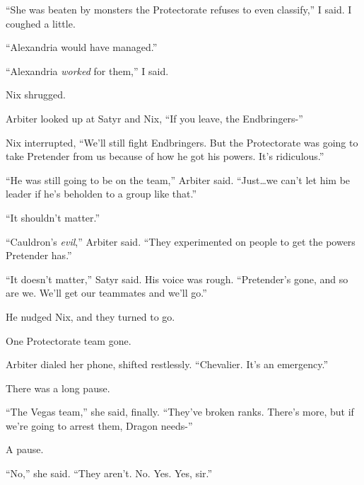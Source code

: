 ``She was beaten by monsters the Protectorate refuses to even classify,'' I said.  I coughed a little.



``Alexandria would have managed.''



``Alexandria \emph{worked} for them,'' I said.



Nix shrugged.



Arbiter looked up at Satyr and Nix, ``If you leave, the Endbringers-''



Nix interrupted, ``We'll still fight Endbringers.  But the Protectorate was going to take Pretender from us because of how he got his powers.  It's ridiculous.''



``He was still going to be on the team,'' Arbiter said.  ``Just\ldots we can't let him be leader if he's beholden to a group like that.''



``It shouldn't matter.''



``Cauldron's \emph{evil},'' Arbiter said.  ``They experimented on people to get the powers Pretender has.''



``It doesn't matter,'' Satyr said.  His voice was rough.  ``Pretender's gone, and so are we.  We'll get our teammates and we'll go.''



He nudged Nix, and they turned to go.



One Protectorate team gone.



Arbiter dialed her phone, shifted restlessly.  ``Chevalier.  It's an emergency.''



There was a long pause.



``The Vegas team,'' she said, finally.  ``They've broken ranks.  There's more, but if we're going to arrest them, Dragon needs-''



A pause.



``No,'' she said.  ``They aren't.  No.  Yes.  Yes, sir.''



